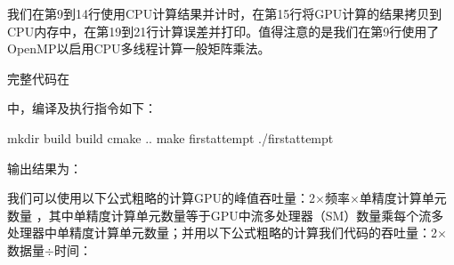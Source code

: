 \documentclass[letterpaper,10pt,english]{sphinxmanual}
\begin{document}
\begin{sphinxVerbatim}[commandchars=\\\{\}]
\end{sphinxVerbatim}

\sphinxAtStartPar
我们在第9到14行使用CPU计算结果并计时，在第15行将GPU计算的结果拷贝到CPU内存中，在第19到21行计算误差并打印。值得注意的是我们在第9行使用了OpenMP以启用CPU多线程计算一般矩阵乘法。

\sphinxAtStartPar
完整代码在%
\begin{footnote}[26]\sphinxAtStartFootnote
{}
%
\end{footnote}中，编译及执行指令如下：

\begin{sphinxVerbatim}[commandchars=\\\{\}]
mkdir build   build
cmake ..
make first\PYGZus{}attempt
./first\PYGZus{}attempt
\end{sphinxVerbatim}

\sphinxAtStartPar
输出结果为：

\begin{sphinxVerbatim}[commandchars=\\\{\}]
   
  
\end{sphinxVerbatim}

\sphinxAtStartPar
我们可以使用以下公式粗略的计算GPU的峰值吞吐量：2\(\times\)频率\(\times\)单精度计算单元数量
，其中单精度计算单元数量等于GPU中流多处理器（SM）数量乘每个流多处理器中单精度计算单元数量；并用以下公式粗略的计算我们代码的吞吐量：2\(\times\)数据量\(\div\)时间：
\end{document}
